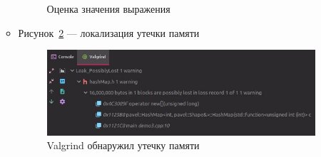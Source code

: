 \documentclass[a4paper, 14pt]{extarticle}
\begin{document}
\begin{enumerate}
\begin{itemize}
\begin{figure}[h]
            \caption{Оценка значения выражения}%
            \label{img:shapes:eval}
        \end{figure}
        \item Рисунок~\ref{img:shapes:leak} --- локализация утечки памяти
        \begin{figure}[h]
            \centering
            \includegraphics[width=\textwidth]{./img/S005.jpg}
            \caption{Valgrind обнаружил утечку памяти}%
            \label{img:shapes:leak}
        \end{figure}
    \end{itemize}
    \FloatBarrier{}
\end{enumerate}

\FloatBarrier{}
\end{document}

